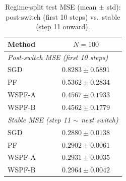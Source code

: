 \begin{table}[t]
\centering
\caption{Regime-split test MSE (mean $\pm$ std): post-switch (first 10 steps) vs.\ stable (step 11 onward).}
\label{tab:regime_split}
\small
\renewcommand{\arraystretch}{1.15}
\begin{tabular}{@{}lc@{}}
\toprule
Method & $N=100$ \\
\midrule
\multicolumn{2}{l}{\textit{Post-switch MSE (first 10 steps)}} \\
SGD & $0.8283 \pm 0.5891$ \\
PF & $0.5362 \pm 0.2834$ \\
WSPF-A & $0.4567 \pm 0.1933$ \\
WSPF-B & $0.4562 \pm 0.1779$ \\
\midrule
\multicolumn{2}{l}{\textit{Stable MSE (step 11 $\sim$ next switch)}} \\
SGD & $0.2880 \pm 0.0138$ \\
PF & $0.2902 \pm 0.0061$ \\
WSPF-A & $0.2931 \pm 0.0035$ \\
WSPF-B & $0.2964 \pm 0.0042$ \\
\bottomrule
\end{tabular}
\end{table}
